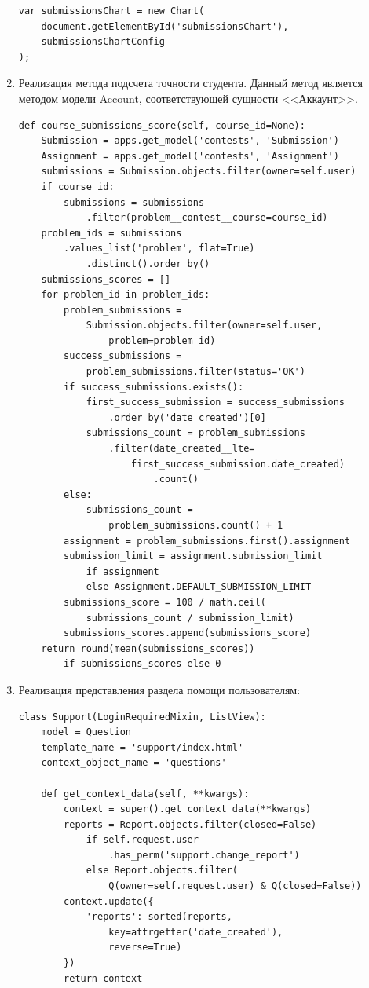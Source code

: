 \documentclass[14pt, a4paper, oneside]{extarticle}
\begin{document}
\begin{enumerate}[wide, labelindent=0pt]
{\begin{verbatim}
var submissionsChart = new Chart(
    document.getElementById('submissionsChart'),
    submissionsChartConfig
);
        \end{verbatim}
    }
    \item {
        Реализация метода подсчета точности студента. Данный метод является методом модели Account, соответствующей сущности <<Аккаунт>>.\label{code:accuracy}
        \begin{verbatim}
def course_submissions_score(self, course_id=None):
    Submission = apps.get_model('contests', 'Submission')
    Assignment = apps.get_model('contests', 'Assignment')
    submissions = Submission.objects.filter(owner=self.user)
    if course_id:
        submissions = submissions
            .filter(problem__contest__course=course_id)
    problem_ids = submissions
        .values_list('problem', flat=True)
            .distinct().order_by()
    submissions_scores = []
    for problem_id in problem_ids:
        problem_submissions = 
            Submission.objects.filter(owner=self.user, 
                problem=problem_id)
        success_submissions = 
            problem_submissions.filter(status='OK')
        if success_submissions.exists():
            first_success_submission = success_submissions
                .order_by('date_created')[0]
            submissions_count = problem_submissions
                .filter(date_created__lte=
                    first_success_submission.date_created)
                        .count()
        else:
            submissions_count = 
                problem_submissions.count() + 1
        assignment = problem_submissions.first().assignment
        submission_limit = assignment.submission_limit 
            if assignment 
            else Assignment.DEFAULT_SUBMISSION_LIMIT
        submissions_score = 100 / math.ceil(
            submissions_count / submission_limit)
        submissions_scores.append(submissions_score)
    return round(mean(submissions_scores)) 
        if submissions_scores else 0
        \end{verbatim}
    }
    \item {
        Реализация представления раздела помощи пользователям:\label{code:support}
        \begin{verbatim}
class Support(LoginRequiredMixin, ListView):
    model = Question
    template_name = 'support/index.html'
    context_object_name = 'questions'

    def get_context_data(self, **kwargs):
        context = super().get_context_data(**kwargs)
        reports = Report.objects.filter(closed=False) 
            if self.request.user
                .has_perm('support.change_report') 
            else Report.objects.filter(
                Q(owner=self.request.user) & Q(closed=False))
        context.update({
            'reports': sorted(reports, 
                key=attrgetter('date_created'), 
                reverse=True)
        })
        return context


\end{verbatim}}
\end{enumerate}
\end{document}
